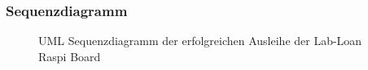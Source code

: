 \subsubsection{Sequenzdiagramm}
\label{sec:server:fsm:sequenz}
\begin{figure}
	\centering
	\caption{UML Sequenzdiagramm der erfolgreichen Ausleihe der Lab-Loan Raspi Board}
	\label{fig:seq}
\end{figure}
